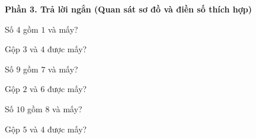 \textbf{Phần 3. Trả lời ngắn (Quan sát sơ đồ và điền số thích hợp)}

\begin{ex} %
Số $4$ gồm $1$ và mấy?
\end{ex}

\begin{ex} %
Gộp $3$ và $4$ được mấy?
\end{ex}

\begin{ex} %
Số $9$ gồm $7$ và mấy?
\end{ex}

\begin{ex} %
Gộp $2$ và $6$ được mấy?
\end{ex}

\begin{ex} %
Số $10$ gồm $8$ và mấy?
\end{ex}

\begin{ex} %
Gộp $5$ và $4$ được mấy?
\end{ex}
